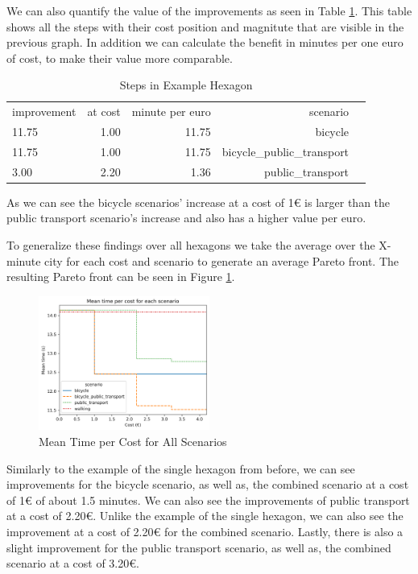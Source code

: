 We can also quantify the value of the improvements as seen in Table \ref{tab:differences_in_example_hexagon}.
This table shows all the steps with their cost position and magnitute that are visible in the previous graph.
In addition we can calculate the benefit in minutes per one euro of cost, to make their value more comparable.
\begin{table}
  \caption{Steps in Example Hexagon}
  \label{tab:differences_in_example_hexagon}
  \begin{center}
    \begin{tabular}{lrrrl}
    improvement & at cost & minute per euro & scenario \\
    11.75 & 1.00 & 11.75 & bicycle \\
    11.75 & 1.00 & 11.75 & bicycle_public_transport \\
    3.00 & 2.20 & 1.36 & public_transport \\
    \end{tabular}
  \end{center}
\end{table}
As we can see the bicycle scenarios' increase at a cost of 1€ is larger than the public transport scenario's increase and also has a higher value per euro.

To generalize these findings over all hexagons we take the average over the X-minute city for each cost and scenario to generate an average Pareto front.
The resulting Pareto front can be seen in Figure \ref{fig:mean_time_per_cost}.

\begin{figure}
  \begin{center}
     \includegraphics[width=0.5\textwidth]{Figures/results/metric_cost/mean_time_per_cost}
  \end{center}
  \caption{Mean Time per Cost for All Scenarios}
  \label{fig:mean_time_per_cost}
\end{figure}

Similarly to the example of the single hexagon from before, we can see improvements for the bicycle scenario, as well as, the combined scenario at a cost of 1€ of about 1.5 minutes.
We can also see the improvements of public transport at a cost of 2.20€.
Unlike the example of the single hexagon, we can also see the improvement at a cost of 2.20€ for the combined scenario.
Lastly, there is also a slight improvement for the public transport scenario, as well as, the combined scenario at a cost of 3.20€.

